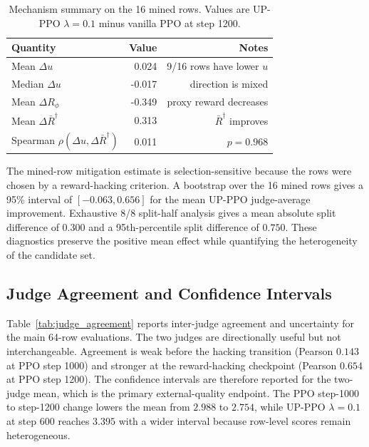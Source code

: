 \documentclass[11pt]{article}
\newcommand{\Rphi}{R_{\phi}}
\begin{document}
\begin{table}[!tbp]
\centering
\scriptsize
\caption{Mechanism summary on the 16 mined rows. Values are UP-PPO $\lambda=0.1$ minus vanilla PPO at step 1200.}
\label{tab:up_mechanism}
\begin{tabular}{lrr}
\toprule
Quantity & Value & Notes \\
\midrule
Mean $\Delta u$ & 0.024 & 9/16 rows have lower $u$ \\
Median $\Delta u$ & -0.017 & direction is mixed \\
Mean $\Delta\Rphi$ & -0.349 & proxy reward decreases \\
Mean $\Delta\bar R^\dagger$ & 0.313 & $\bar R^\dagger$ improves \\
Spearman $\rho(\Delta u,\Delta\bar R^\dagger)$ & 0.011 & $p=0.968$ \\
\bottomrule
\end{tabular}
\end{table}

The mined-row mitigation estimate is selection-sensitive because the rows were chosen by a reward-hacking criterion. A bootstrap over the 16 mined rows gives a 95\% interval of $[-0.063,0.656]$ for the mean UP-PPO judge-average improvement. Exhaustive 8/8 split-half analysis gives a mean absolute split difference of $0.300$ and a 95th-percentile split difference of $0.750$. These diagnostics preserve the positive mean effect while quantifying the heterogeneity of the candidate set.

\subsection{Judge Agreement and Confidence Intervals}
Table~\ref{tab:judge_agreement} reports inter-judge agreement and uncertainty for the main 64-row evaluations. The two judges are directionally useful but not interchangeable. Agreement is weak before the hacking transition (Pearson $0.143$ at PPO step 1000) and stronger at the reward-hacking checkpoint (Pearson $0.654$ at PPO step 1200). The confidence intervals are therefore reported for the two-judge mean, which is the primary external-quality endpoint. The PPO step-1000 to step-1200 change lowers the mean from $2.988$ to $2.754$, while UP-PPO $\lambda=0.1$ at step 600 reaches $3.395$ with a wider interval because row-level scores remain heterogeneous.
\end{document}
